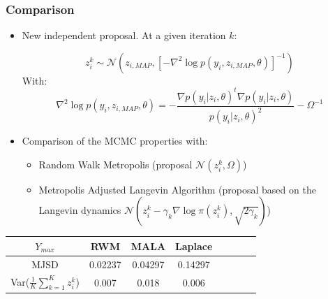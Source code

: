\documentclass[xcolor={dvipsnames}]{beamer}
\begin{document}
\begin{frame}
\frametitle{Comparison}

\begin{itemize}
\item New independent proposal. At a given iteration $k$:

  \begin{equation}
  z_i^k \sim \mathcal{N}(z_{i,MAP}, [-\nabla^2\log p(y_i,z_{i,MAP},\theta)]^{-1})
  \end{equation}
With:
\begin{equation}
\nabla^2\log p(y_i,z_{i,MAP},\theta) = - \frac{\nabla p(y_i|z_i,\theta)^t \nabla p(y_i|z_i,\theta)}{p(y_i|z_i,\theta)^2} - \Omega^{-1}
\end{equation}
\item Comparison of the MCMC properties with:
\begin{itemize}
  \item Random Walk Metropolis (proposal $\mathcal{N}(z_i^k , \Omega)$)
  \item Metropolis Adjusted Langevin Algorithm (proposal based on the Langevin dynamics $\mathcal{N}(z_i^k - \gamma_k \nabla \log \pi(z_i^k), \sqrt{2\gamma_k})$)
\end{itemize}
\end{itemize}


\begin{center}
\begin{tabular}{SSSSSSSS} \toprule
    {$Y_{max}$} & {RWM} & {MALA} & {Laplace} \\ \midrule
    MJSD  & 0.02237 & 0.04297 & 0.14297  \\ 
    Var($\frac{1}{K}\sum_{k=1}^{K}{z^k_i}$)  & 0.007 & 0.018 & 0.006  \\ \bottomrule
\end{tabular}
\end{center}

\end{frame}
\end{document}
